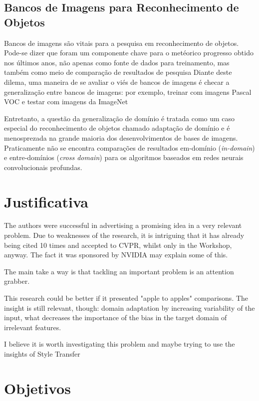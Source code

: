\documentclass[
12pt, %
a4paper, %
onecolumn, %
]{article}
\begin{document}
\subsection{Bancos de Imagens para Reconhecimento de Objetos}

Bancos de imagens são vitais para a pesquisa em reconhecimento de objetos. Pode-se dizer que foram um componente chave para o metéorico progresso obtido nos últimos anos, não apenas como fonte de dados para treinamento, mas também como meio de comparação de resultados de pesquisa
Diante deste dilema, uma maneira de se avaliar o viés de bancos de imagens é checar a generalização entre bancos de imagens: por exemplo, treinar com imagens Pascal VOC e testar com imagens da ImageNet

Entretanto, a questão da generalização de domínio é tratada como um caso especial do reconhecimento de objetos chamado adaptação de domínio e é menosprezada na grande maioria dos desenvolvimentos de bases de imagens. Praticamente não se encontra comparações de resultados em-domínio (\textit{in-domain}) e entre-domínios (\textit{cross domain}) para os algoritmos baseados em redes neurais convolucionais profundas. 


\section{Justificativa}

The authors were successful in advertising a promising idea in a very relevant problem.  Due to weaknesses of the research, it is intriguing that it has already being cited 10 times and accepted to CVPR, whilst only in the Workshop, anyway. The fact it was sponsored by NVIDIA may explain some of this.

The main take a way is that tackling an important problem is an attention grabber. 

This research could be better if it presented "apple to apples" comparisons. The insight is still relevant, though: domain adaptation by increasing variability of the input, what decreases the importance of the bias in the target domain of irrelevant features.

I believe it is worth investigating this problem and maybe trying to use the insights of Style Transfer


\section{Objetivos}
\end{document}
